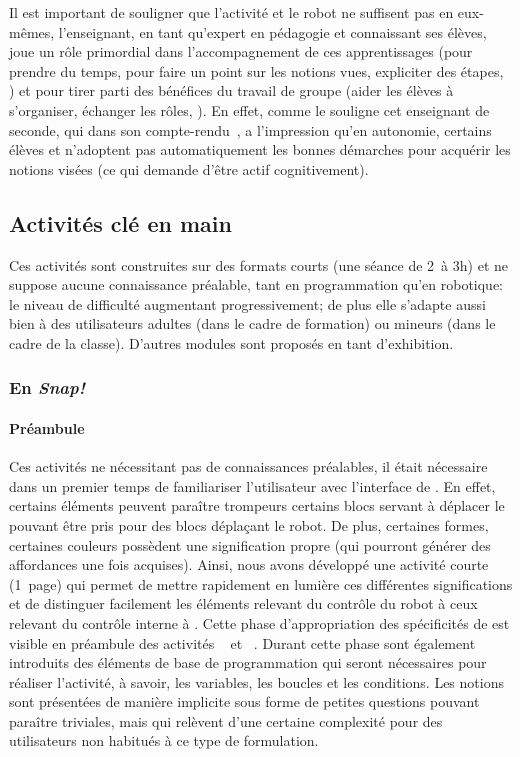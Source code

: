         Il est important de souligner que l'activité et le robot ne suffisent pas en eux-mêmes, l'enseignant, en tant qu'expert en pédagogie et connaissant ses élèves, joue un rôle primordial dans l'accompagnement de ces apprentissages (pour prendre du temps, pour faire un point sur les notions vues, expliciter des étapes, \etc) et pour tirer parti des bénéfices du travail de groupe (aider les élèves à s'organiser, échanger les rôles, \etc). En effet, comme le souligne cet enseignant de seconde, qui dans son compte-rendu~, a l'impression qu'en autonomie, certains élèves   et n'adoptent pas automatiquement les bonnes démarches pour acquérir les notions visées (ce qui demande d'être actif cognitivement).
    \subsection{Activités clé en main}\label{sec:handKey}
        Ces activités sont construites sur des formats courts (une séance de 2~à 3h) et ne suppose aucune connaissance préalable, tant en programmation qu'en robotique: le niveau de difficulté augmentant progressivement; de plus elle s'adapte aussi bien à des utilisateurs adultes (dans le cadre de formation) ou mineurs (dans le cadre de la classe). D'autres modules sont proposés en tant d'exhibition. 
        \subsubsection{En \textit{Snap!}}
            \paragraph{Préambule}
                Ces activités ne nécessitant pas de connaissances préalables, il était nécessaire dans un premier temps de familiariser l'utilisateur avec l'interface de . En effet, certains éléments peuvent paraître trompeurs \eg certains blocs servant à déplacer le   pouvant être pris pour des blocs déplaçant le robot. De plus, certaines formes, certaines couleurs possèdent une signification propre (qui pourront générer des affordances une fois acquises). Ainsi, nous avons développé une activité courte (1~page) qui permet de mettre rapidement en lumière ces différentes significations et de distinguer facilement les éléments relevant du contrôle du robot à ceux relevant du contrôle interne à . Cette phase d'appropriation des spécificités de  est visible en préambule des activités  ~ et  ~. Durant cette phase sont également introduits des éléments de base de programmation qui seront nécessaires pour réaliser l'activité, à savoir, les variables, les boucles et les conditions. Les notions sont présentées de manière implicite sous forme de petites questions pouvant paraître triviales, mais qui relèvent d'une certaine complexité pour des utilisateurs non habitués à ce type de formulation.
